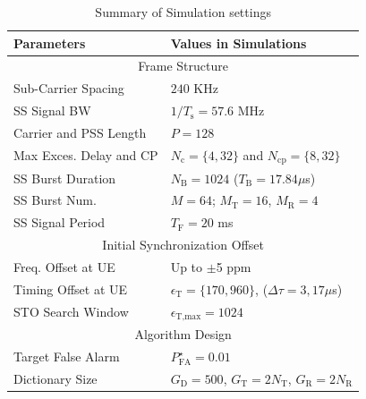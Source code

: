 \documentclass[journal]{IEEEtran}
\newcommand{\tx}[0]{\text{T}}
\newcommand{\rx}[0]{\text{R}}
\newcommand{\Ts}[0]{T_{\text{s}}}
\newcommand{\Tb}[0]{T_{\text{B}}}
\newcommand{\Nb}[0]{N_{\text{B}}}
\newcommand{\Nc}[0]{N_{\text{c}}}
\newcommand{\Ncp}[0]{N_{\text{cp}}}
\newcommand{\TSS}[0]{T_{\text{F}}}
\newcommand{\Gr}[0]{G_{\text{R}}}
\newcommand{\Gt}[0]{G_{\text{T}}}
\newcommand{\Gd}[0]{G_{\text{D}}}
\begin{document}
\begin{table}
\caption{Summary of Simulation settings}
\centering
\begin{tabular}{|l|l|}
\hline 
\textbf{Parameters} & \textbf{Values in Simulations}\tabularnewline
\hline 
\hline 
\multicolumn{2}{|c|}{Frame Structure} \tabularnewline
\hline
Sub-Carrier Spacing  & $240$ KHz \cite{Giordani_beam_turotial_arxiv_1804}\tabularnewline
\hline
SS Signal BW & $1/\Ts = 57.6$ MHz \cite{Giordani_beam_turotial_arxiv_1804}\tabularnewline
\hline 
Carrier and PSS Length & $P = 128$ \cite{Giordani_beam_turotial_arxiv_1804} \tabularnewline
\hline
Max Exces. Delay and CP & $\Nc = \{4,32\}$ and $\Ncp = \{8,32\}$\tabularnewline
\hline 
SS Burst Duration & $\Nb = 1024$ ($\Tb =17.84\mu$s) \cite{Giordani_beam_turotial_arxiv_1804} \tabularnewline
\hline 
SS Burst Num. & $M = 64$\cite{Giordani_beam_turotial_arxiv_1804}; $M_{\text{T}} = 16$, $M_{\text{R}} = 4$ \tabularnewline
\hline
SS Signal Period & $\TSS = 20$ ms \cite{Giordani_beam_turotial_arxiv_1804}\tabularnewline
\hline 
\hline  
\multicolumn{2}{|c|}{Initial Synchronization Offset} \tabularnewline
\hline
Freq. Offset at UE & Up to $\pm$5 ppm \cite{CFO_IA_spec} \tabularnewline
\hline 
Timing Offset at UE& $\epsilon_{\text{T}} = \{170,960\}$, ($\Delta\tau = 3,17\mu$s) \tabularnewline
\hline
STO Search Window& $\epsilon_{\text{T,max}} = 1024$ \tabularnewline
\hline
\hline
\multicolumn{2}{|c|}{Algorithm Design} \tabularnewline
\hline
Target False Alarm& $P^{\star}_{\text{FA}} = 0.01$ \tabularnewline
\hline
Dictionary Size & $\Gd = 500$, $\Gt = 2N_{\tx}$, $\Gr = 2N_{\rx}$ \tabularnewline
\hline
\end{tabular}
\vspace{-1mm}
\label{tab:simulation_setting}
\end{table}
\end{document}
